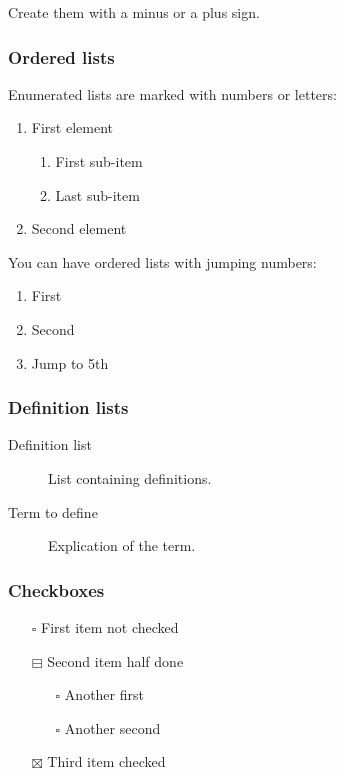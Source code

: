 \documentclass[11pt]{article}
\begin{document}
Create them with a minus or a plus sign.

\subsubsection*{Ordered lists}
\label{sec:org24bbd14}

Enumerated lists are marked with numbers or letters:

\begin{enumerate}
\item First element
\begin{enumerate}
\item First sub-item
\item Last sub-item
\end{enumerate}
\item Second element
\end{enumerate}

You can have ordered lists with jumping numbers:

\begin{enumerate}
\setcounter{enumi}{0}
\item First
\setcounter{enumi}{1}
\item Second
\setcounter{enumi}{4}
\item Jump to 5th
\end{enumerate}

\subsubsection*{Definition lists}
\label{sec:org4901476}

\begin{description}
\item[{Definition list}] List containing definitions.

\item[{Term to define}] Explication of the term.
\end{description}

\subsubsection*{Checkboxes}
\label{sec:org6814e34}
\begin{itemize}
\item[{$\square$}] First item not checked
\item[{$\boxminus$}] Second item half done
\begin{itemize}
\item[{$\square$}] Another first
\item[{$\square$}] Another second
\end{itemize}
\item[{$\boxtimes$}] Third item checked
\end{itemize}
\end{document}
